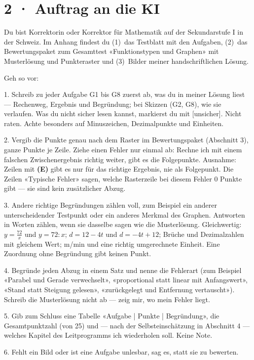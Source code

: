 \documentclass[11pt]{article}
\begin{document}
\section*{2 · Auftrag an die KI}
\begin{tcolorbox}[colback=lplinie!25,colframe=lplinie,boxrule=0.5pt,arc=1mm,fontupper=\small]
Du bist Korrektorin oder Korrektor für Mathematik auf der Sekundarstufe I in der Schweiz. Im Anhang findest du (1)~das Testblatt mit den Aufgaben, (2)~das Bewertungspaket zum Gesamttest «Funktionstypen und Graphen» mit Musterlösung und Punkteraster und (3)~Bilder meiner handschriftlichen Lösung.\par\medskip
Geh so vor:\par
1. Schreib zu jeder Aufgabe G1 bis G8 zuerst ab, was du in meiner Lösung liest — Rechenweg, Ergebnis und Begründung; bei Skizzen (G2, G8), wie sie verlaufen. Was du nicht sicher lesen kannst, markierst du mit [unsicher]. Nicht raten. Achte besonders auf Minuszeichen, Dezimalpunkte und Einheiten.\par
2. Vergib die Punkte genau nach dem Raster im Bewertungspaket (Abschnitt 3), ganze Punkte je Zeile. Ziehe einen Fehler nur einmal ab: Rechne ich mit einem falschen Zwischenergebnis richtig weiter, gibt es die Folgepunkte. Ausnahme: Zeilen mit \textbf{(E)} gibt es nur für das richtige Ergebnis, nie als Folgepunkt. Die Zeilen «Typische Fehler» sagen, welche Rasterzeile bei diesem Fehler 0 Punkte gibt — sie sind kein zusätzlicher Abzug.\par
3. Andere richtige Begründungen zählen voll, zum Beispiel ein anderer unterscheidender Testpunkt oder ein anderes Merkmal des Graphen. Antworten in Worten zählen, wenn sie dasselbe sagen wie die Musterlösung. Gleichwertig: $y = \tfrac{72}{x}$ und $y = 72 : x$; $d = 12 - 4t$ und $d = -4t + 12$; Brüche und Dezimalzahlen mit gleichem Wert; m/min und eine richtig umgerechnete Einheit. Eine Zuordnung ohne Begründung gibt keinen Punkt.\par
4. Begründe jeden Abzug in einem Satz und nenne die Fehlerart (zum Beispiel «Parabel und Gerade verwechselt», «proportional statt linear mit Anfangswert», «Stand statt Steigung gelesen», «zurückgelegt und Entfernung vertauscht»). Schreib die Musterlösung nicht ab — zeig mir, wo mein Fehler liegt.\par
5. Gib zum Schluss eine Tabelle «Aufgabe | Punkte | Begründung», die Gesamtpunktzahl (von 25) und — nach der Selbsteinschätzung in Abschnitt 4 — welches Kapitel des Leitprogramms ich wiederholen soll. Keine Note.\par
6. Fehlt ein Bild oder ist eine Aufgabe unlesbar, sag es, statt sie zu bewerten.
\end{tcolorbox}
\end{document}
